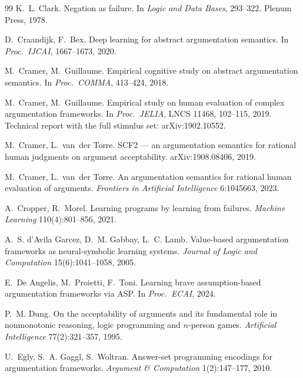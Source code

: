 \documentclass[review,12pt]{elsarticle}
\theoremstyle{definition}
\theoremstyle{remark}
\begin{document}
\begin{thebibliography}{99}
K.~L. Clark.
Negation as failure.
In \emph{Logic and Data Bases}, 293--322. Plenum Press, 1978.

D.~Craandijk, F.~Bex.
Deep learning for abstract argumentation semantics.
In \emph{Proc.\ IJCAI}, 1667--1673, 2020.


M.~Cramer, M.~Guillaume.
Empirical cognitive study on abstract argumentation semantics.
In \emph{Proc.\ COMMA}, 413--424, 2018.

M.~Cramer, M.~Guillaume.
Empirical study on human evaluation of complex argumentation frameworks.
In \emph{Proc.\ JELIA}, LNCS 11468, 102--115, 2019. Technical report with
the full stimulus set: arXiv:1902.10552.

M.~Cramer, L.~van~der Torre.
SCF2 --- an argumentation semantics for rational human judgments on argument
acceptability.
arXiv:1908.08406, 2019.

M.~Cramer, L.~van~der Torre.
An argumentation semantics for rational human evaluation of arguments.
\emph{Frontiers in Artificial Intelligence} 6:1045663, 2023.

A.~Cropper, R.~Morel.
Learning programs by learning from failures.
\emph{Machine Learning} 110(4):801--856, 2021.

A.~S. d'Avila Garcez, D.~M. Gabbay, L.~C. Lamb.
Value-based argumentation frameworks as neural-symbolic learning systems.
\emph{Journal of Logic and Computation} 15(6):1041--1058, 2005.

E.~De Angelis, M.~Proietti, F.~Toni.
Learning brave assumption-based argumentation frameworks via ASP.
In \emph{Proc.\ ECAI}, 2024.


P.~M. Dung.
On the acceptability of arguments and its fundamental role in nonmonotonic
reasoning, logic programming and $n$-person games.
\emph{Artificial Intelligence} 77(2):321--357, 1995.

U.~Egly, S.~A. Gaggl, S.~Woltran.
Answer-set programming encodings for argumentation frameworks.
\emph{Argument \& Computation} 1(2):147--177, 2010.


\end{thebibliography}
\end{document}
